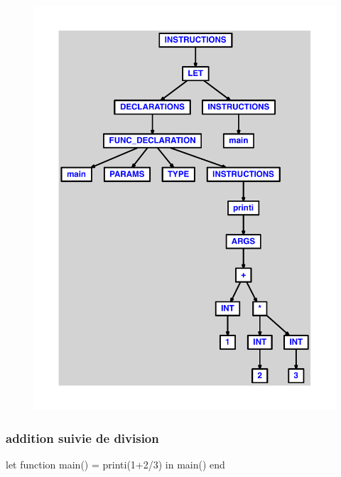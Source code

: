 \documentclass{article}
\begin{document}
\begin{figure}[H]\centering\includegraphics[max width=\textwidth]{ast/ast_45.pdf}\end{figure}\subsubsection{addition suivie de division}
\begin{verbatimtab}
let
	function main() = printi(1+2/3)
in main() end
\end{verbatimtab}
\end{document}
